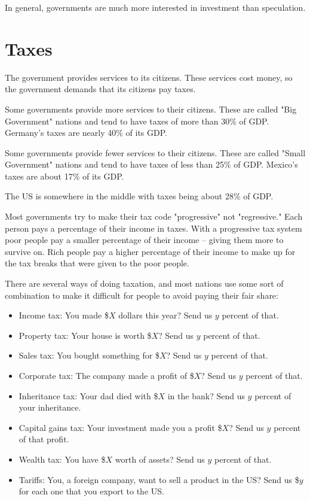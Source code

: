 In general, governments are much more interested in investment than speculation.

\section{Taxes}

The government provides services to its citizens.  These services cost money, so the government demands that its citizens pay taxes.

Some governments provide more services to their citizens. These are called "Big Government" nations and tend to have taxes of more than 30\% of GDP. Germany's taxes are nearly 40\% of its GDP.

Some governments provide fewer services to their citizens. These are called "Small Government" nations and tend to have taxes of less than 25\% of GDP. Mexico's taxes are about 17\% of its GDP.

The US is somewhere in the middle with taxes being about 28\% of GDP.

Most governments try to make their tax code "progressive" not "regressive."  Each person pays a percentage of their income in taxes. With a progressive tax system poor people pay a smaller percentage of their income -- giving them more to survive on.  Rich people pay a higher percentage of their income to make up for the tax breaks that were given to the poor people.

There are several ways of doing taxation, and most nations use some sort of combination to make it difficult for people to avoid paying their fair share:
\begin{itemize}
\item Income tax: You made \$$X$ dollars this year? Send us $y$ percent of that.
\item Property tax: Your house is worth \$$X$? Send us $y$ percent of that.
\item Sales tax: You bought something for \$$X$? Send us $y$ percent of that.
\item Corporate tax: The company made a profit of \$$X$? Send us $y$ percent of that.
\item Inheritance tax: Your dad died with \$$X$ in the bank? Send us $y$ percent of your inheritance.
\item Capital gains tax: Your investment made you a profit \$$X$? Send us $y$ percent of that profit.
\item Wealth tax: You have \$$X$ worth of assets? Send us $y$ percent of that.
\item Tariffs: You, a foreign company, want to sell a product in the US? Send us \$$y$ for each one that you export to the US.
\end{itemize}

